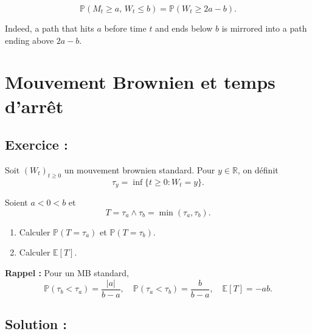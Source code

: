 \[
\mathbb{P}(M_t \ge a,\, W_t \le b)
= \mathbb{P}(W_t \ge 2a - b).
\]

Indeed, a path that hits \(a\) before time \(t\) and ends below \(b\)
is mirrored into a path ending above \(2a - b\).





\section{Mouvement Brownien et temps d'arrêt}

\subsection*{Exercice :}

\begin{exerciseBox}
Soit $(W_t)_{t \ge 0}$ un mouvement brownien standard. Pour $y \in \mathbb{R}$, on définit
\[
\tau_y = \inf \{ t \ge 0 : W_t = y \}.
\]

Soient $a < 0 < b$ et
\[
T = \tau_a \wedge \tau_b = \min(\tau_a, \tau_b).
\]

\begin{enumerate}
    \item Calculer $\mathbb{P}(T = \tau_a)$ et $\mathbb{P}(T = \tau_b)$.
    \item Calculer $\mathbb{E}[T]$.
\end{enumerate}
  
\end{exerciseBox}

\textbf{Rappel :} Pour un MB standard,
\[
\mathbb{P}(\tau_b < \tau_a) = \frac{|a|}{b-a}, \quad 
\mathbb{P}(\tau_a < \tau_b) = \frac{b}{b-a}, \quad
\mathbb{E}[T] = -a b.
\]


\subsection*{Solution : }



